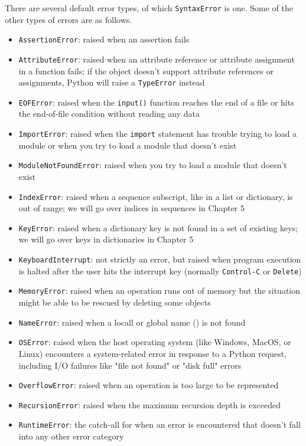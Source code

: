 There are several default error types, of which \verb|SyntaxError| is one. Some of the other types of errors are as follows.
\begin{itemize}
    \item \verb|AssertionError|: raised when an assertion fails
    \item \verb|AttributeError|: raised when an attribute reference or attribute assignment in a function fails; if the object doesn't support attribute references or assignments, Python will raise a \verb|TypeError| instead
    \item \verb|EOFError|: raised when the \verb|input()| function reaches the end of a file or hits the end-of-file condition without reading any data
    \item \verb|ImportError|: raised when the \verb|import| statement has trouble trying to load a module or when you try to load a module that doesn't exist
    \item \verb|ModuleNotFoundError|: raised when you try to load a module that doesn't exist
    \item \verb|IndexError|: raised when a sequence subscript, like in a list or dictionary, is out of range; we will go over indices in sequences in Chapter 5
    \item \verb|KeyError|: raised when a dictionary key is not found in a set of existing keys; we will go over keys in dictionaries in Chapter 5
    \item \verb|KeyboardInterrupt|: not strictly an error, but raised when program execution is halted after the user hits the interrupt key (normally \verb|Control-C| or \verb|Delete|)
    \item \verb|MemoryError|: raised when an operation runs out of memory but the situation might be able to be rescued by deleting some objects
    \item \verb|NameError|: raised when a locall or global name () is not found
    \item \verb|OSError|: raised when the host operating system (like Windows, MacOS, or Linux) encounters a system-related error in response to a Python request, including I/O failures like "file not found" or "disk full" errors
    \item \verb|OverflowError|: raised when an  operation is too large to be represented
    \item \verb|RecursionError|: raised when the maximum recursion depth is exceeded
    \item \verb|RuntimeError|: the catch-all for when an error is encountered that doesn't fall into any other error category

\end{itemize}
